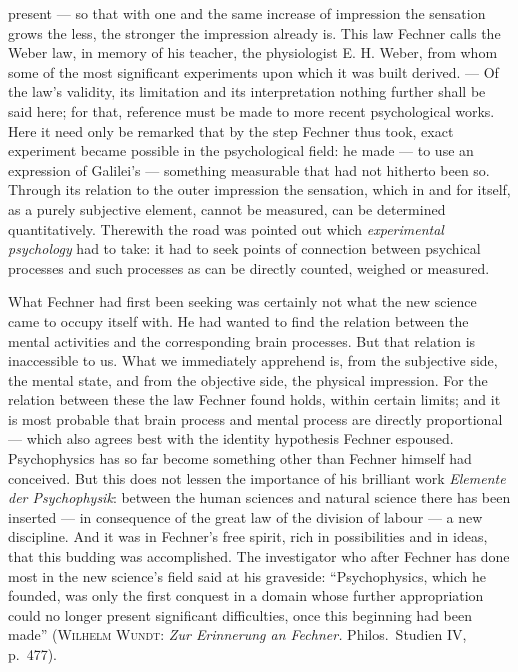 \documentclass[12pt,a4paper]{book}
\newcommand{\opage}[1]{\marginnote{\footnotesize\textit{[#1]}}}
\begin{document}
present --- so that with one and the same increase of impression the sensation
grows the less, the stronger the impression already is. This law Fechner calls
the Weber law, in memory of his teacher, the physiologist E. H. Weber, from whom
some of the most significant experiments upon which it was built derived. --- Of
the law's validity, its limitation and its interpretation nothing further shall
be said here; for that, reference must be made to more recent psychological
works. Here it need only be remarked that by the step Fechner thus took, exact
experiment became possible in the psychological field: he made --- to use an
expression of Galilei's --- something measurable that had not hitherto been so.
Through its relation to the outer impression the sensation, which in and for
itself, as a purely subjective element, cannot be measured, can be determined
quantitatively. Therewith the road was \opage{533}pointed out which \emph{experimental
psychology} had to take: it had to seek points of connection between psychical
processes and such processes as can be directly counted, weighed or measured.

What Fechner had first been seeking was certainly not what the new science came
to occupy itself with. He had wanted to find the relation between the mental
activities and the corresponding brain processes. But that relation is
inaccessible to us. What we immediately apprehend is, from the subjective side,
the mental state, and from the objective side, the physical impression. For the
relation between these the law Fechner found holds, within certain limits; and it
is most probable that brain process and mental process are directly proportional
--- which also agrees best with the identity hypothesis Fechner espoused.
Psychophysics has so far become something other than Fechner himself had
conceived. But this does not lessen the importance of his brilliant work
\textit{Elemente der Psychophysik}: between the human sciences and natural
science there has been inserted --- in consequence of the great law of the
division of labour --- a new discipline. And it was in Fechner's free spirit,
rich in possibilities and in ideas, that this budding was accomplished. The
investigator who after Fechner has done most in the new science's field said at
his graveside: ``Psychophysics, which he founded, was only the first conquest in
a domain whose further appropriation could no longer present significant
difficulties, once this beginning had been made'' (\textsc{Wilhelm Wundt}:
\textit{Zur Erinnerung an Fechner.} Philos.\ Studien IV, p.~477).
\end{document}
